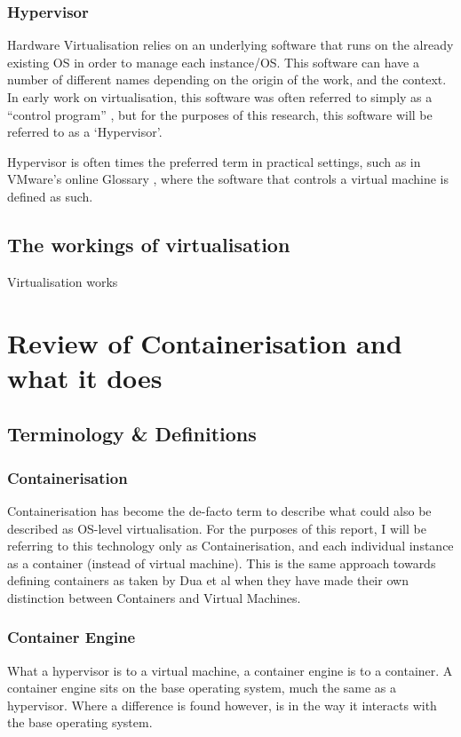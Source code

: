 \subsection{Hypervisor}
\label{subsec:hypervisor}
Hardware Virtualisation relies on an underlying software that runs on the already existing OS in order to manage each instance/OS. This software can have a number of different names depending on the origin of the work, and the context. In early work on virtualisation, this software was often referred to simply as a ``control program'' \citep{creasy1981}, but for the purposes of this research, this software will be referred to as a `Hypervisor'.

Hypervisor is often times the preferred term in practical settings, such as in VMware's online Glossary \citep{vmwareHypervisor}, where the software that controls a virtual machine is defined as such.

\section{The workings of virtualisation}
Virtualisation works


\chapter{Review of Containerisation and what it does}
\section{Terminology \& Definitions}

\subsection{Containerisation}
\label{subsec:containerisation}
Containerisation has become the de-facto term to describe what could also be described as OS-level virtualisation. For the purposes of this report, I will be referring to this technology only as Containerisation, and each individual instance as a container (instead of virtual machine). This is the same approach towards defining containers as taken by Dua et al \citep{dua14} when they have made their own distinction between Containers and Virtual Machines.

\subsection{Container Engine}
\label{Container Engine}
What a hypervisor is to a virtual machine, a container engine is to a container. A container engine sits on the base operating system, much the same as a hypervisor. Where a difference is found however, is in the way it interacts with the base operating system.

